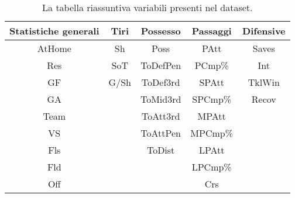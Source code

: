 	\begin{table}[!htb]%
	
	\renewcommand{\arraystretch}{1.7}
	\centering
	\begin{tabular}{c c c c c}
		\hline	
		
		\textbf{Statistiche generali} & \textbf{Tiri} & \textbf{Possesso} & \textbf{Passaggi} & \textbf{Difensive} \\	
		\hline			
		AtHome & Sh & Poss & PAtt & Saves\\
		Res & SoT & ToDefPen & PCmp\% & Int\\
		GF & G/Sh & ToDef3rd & SPAtt & TklWin\\
		GA &  & ToMid3rd & SPCmp\% & Recov\\
		Team &  & ToAtt3rd & MPAtt&\\
		VS &  & ToAttPen & MPCmp\% &\\
		Fls &  & ToDist & LPAtt &\\
		Fld &  &  & LPCmp\% &\\
		Off &  &  & Crs \\
		\hline

		
	\end{tabular} \hbox{}
	
	\caption{La tabella riassuntiva variabili presenti nel dataset.} \label{tab:summary}
\end{table}



